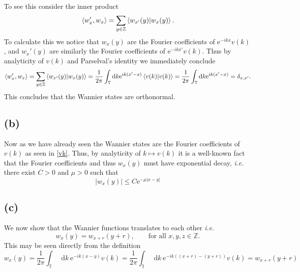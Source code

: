 \documentclass[a4paper,11pt]{article}
\newcommand{\euler}[1]{\text{e}^{#1}}
\newcommand{\abs}[1]{\left\lvert #1 \right\rvert}
\newcommand*\diff{\mathop{}\!\mathrm{d}}
\newcommand{\Z}{\mathbb{Z}}
\numberwithin{equation}{section}
\begin{document}
 	 To see this consider the inner product \begin{equation}
 	 \braket{w_x',w_x}=\sum_{y\in \Z}\braket{w_{x'}(y)|w_x(y)}.
 	 \end{equation}
 	 To calculate this we notice that $ w_x(y) $ are the Fourier coefficients of $ \euler{-ikx}v(k) $, and $ w_x'(y) $ are similarly the Fourier coefficients of $ \euler{-ikx'}v(k) $. Thus by analyticity of $ v(k) $ and Parselval's identity we immediately conclude \begin{equation}
 	 \braket{w_x',w_x}=\sum_{y\in \Z}\braket{w_{x'}(y)|w_x(y)}=\frac{1}{2\pi}\int_{\mathbb{T}} \diff k \euler{ik(x'-x)}\braket{v(k)|v(k)}=\frac{1}{2\pi}\int_{\mathbb{T}}\diff k\euler{ik(x'-x)}=\delta_{x,x'}.
 	 \end{equation} 
 	 This concludes that the Wannier states are orthonormal.
 	 \subsection*{(b)}
 	 Now as we have already seen the Wannier states are the Fourier coefficients of $ v(k) $ as seen in \eqref{vk}. Thus, by analyticity of $ k\mapsto v(k) $ it is a well-known fact that the Fourier coefficients and thus $ w_x(y) $ must have exponential decay, \emph{i.e.} there exist $ C>0 $ and $ \mu>0 $ such that\begin{equation}
 	 \abs{w_x(y)}\leq C\euler{-\mu|x-y|}
 	 \end{equation} 
 	 \subsection*{(c)}
 	 We now show that the Wannier functions translates to each other \emph{i.e.} \begin{equation}
 	 w_{x}(y)=w_{x+r}(y+r),\qquad \text{for all }x,y,z\in\Z.
 	 \end{equation}
 	 This may be seen directly from the definition \begin{equation}
 	 w_{x}(y)=\frac{1}{2\pi}\int_{\mathbb{T}}\diff k\ \euler{-ik(x-y)}v(k)=\frac{1}{2\pi}\int_{\mathbb{T}}\diff k\ \euler{-ik((x+r)-(y+r))}v(k)=w_{x+r}(y+r)
 	 \end{equation}
\end{document}
